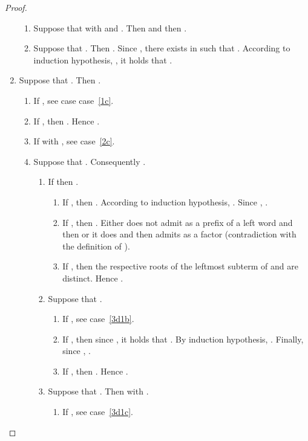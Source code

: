 \documentclass[a4paper]{llncs}
\begin{document}
\begin{proof}
\begin{enumerate}
\begin{enumerate}
    \item\label{2c} Suppose that  with  and . Then  and then .
    
    \item Suppose that . Then  . Since , there exists  in  such that . According to induction hypothesis, , it holds that .
    \end{enumerate}
    \item  Suppose that . Then .
    \begin{enumerate}
    \item If , see case case~\ref{1c}.
    
    \item If , then . Hence . 
    
    \item If  with , see case~\ref{2c}.
    
    \item Suppose that . Consequently .
    
    \begin{enumerate}
    \item If  then .
    \begin{enumerate}
    \item If , then . According to induction hypothesis,  . Since , .
    
    \item\label{3d1b} If , then . Either  does not admit  as a prefix of a left word and then  or it does and then  admits  as a factor (contradiction with the definition of ).
    
    \item\label{3d1c} If , then the respective roots of the leftmost subterm of   and  are distinct. Hence .
    
    \end{enumerate}
    \item Suppose that .
    
    \begin{enumerate}
    \item If , see case~\ref{3d1b}.
    
    \item If , then since , it holds that . By induction hypothesis, . Finally, since , .
    
    \item If , then . Hence .
    \end{enumerate}
    \item Suppose that . Then  with .
    \begin{enumerate}
    \item If , see case~\ref{3d1c}.
    

\end{enumerate}
\end{enumerate}
\end{enumerate}
\end{enumerate}
\end{proof}
\end{document}
